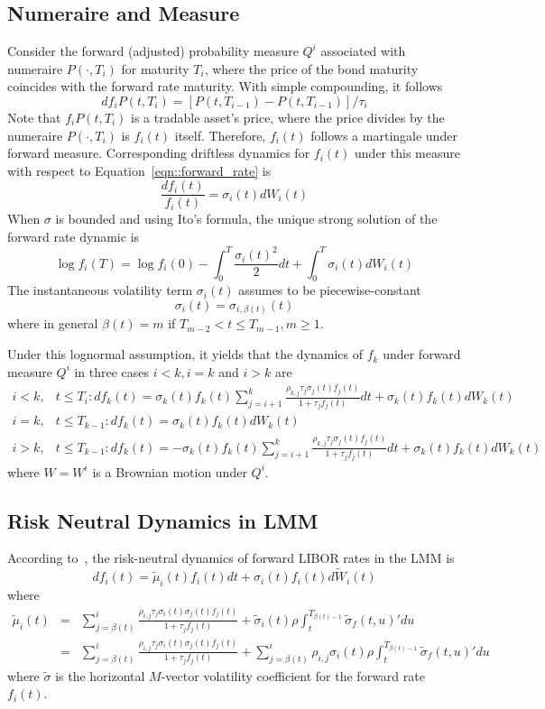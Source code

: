 \subsection{Numeraire and Measure}
Consider the forward (adjusted) probability measure $Q^i$ associated with numeraire $P(\cdot,T_i)$ for maturity $T_i$, where the price of the bond maturity coincides with the forward rate maturity. With simple compounding, it follows
$$
d f_i P(t,T_i) = [P(t,T_{i-1}) - P(t,T_{i-1})] / \tau_i
$$
Note that $f_i P(t,T_i)$ is a tradable asset's price, where the price divides by the numeraire $P(\cdot,T_i)$ is $f_i(t)$ itself. Therefore, $f_i(t)$ follows a martingale under forward measure. Corresponding driftless dynamics for $f_i(t)$ under this measure with respect to Equation~\ref{eqn::forward_rate} is
$$
\frac{d f_i(t)}{f_i(t)} = \sigma_i(t) dW_i(t)
$$
When $\sigma$ is bounded and using Ito's formula, the unique strong solution of the forward rate dynamic is
$$
\log f_i (T) = \log f_i(0) - \int_0^T \frac{\sigma_i(t)^2}{2} dt + \int_0^T \sigma_i(t) dW_i(t)
$$
The instantaneous volatility term $\sigma_i(t)$ assumes to be piecewise-constant
$$
\sigma_i(t) = \sigma_{i,\beta(t)}(t)
$$
where in general $\beta(t)=m$ if $T_{m-2}<t \leq T_{m-1}, m\geq 1$.

Under this lognormal assumption, it yields that the dynamics of $f_k$ under forward measure $Q^i$ in three cases $i<k, i=k$ and $i>k$ are
\begin{eqnarray*}
i<k,& t\leq T_i: df_k(t) = \sigma_k(t)f_k(t)\sum_{j=i+1}^{k}\frac{\rho_{k,j}\tau_j\sigma_j(t)f_j(t)}{1+\tau_j f_j(t)}dt + \sigma_k(t) f_k(t) dW_k(t) \\
i=k,& t\leq T_{k-1}: df_k(t) = \sigma_k(t) f_k(t) dW_k(t) \\
i>k,& t\leq T_{k-1}: df_k(t) = -\sigma_k(t)f_k(t)\sum_{j=i+1}^{k}\frac{\rho_{k,j}\tau_j\sigma_j(t)f_j(t)}{1+\tau_j f_j(t)}dt + \sigma_k(t) f_k(t) dW_k(t)
\end{eqnarray*}
where $W=W^i$ is a Brownian motion under $Q^i$.

\subsection{Risk Neutral Dynamics in LMM}
According to~\cite{bm06}, the risk-neutral dynamics of forward LIBOR rates in the LMM is
$$
d f_i(t) = \tilde{\mu}_i(t) f_i(t)dt + \sigma_i(t)f_i(t) d \tilde{W}_i(t)
$$
where
\begin{eqnarray*}
\tilde{\mu}_i(t) &=& \sum_{j=\beta(t)}^{i} \frac{\rho_{i,j}\tau_j\sigma_i(t)\sigma_j(t)f_j(t)}{1+\tau_j f_j(t)} + \tilde{\sigma}_i(t)\rho\int_t^{T_{\beta(t)-1}}\tilde{\sigma}_f(t,u)'du \\
                 &=& \sum_{j=\beta(t)}^{i} \frac{\rho_{i,j}\tau_j\sigma_i(t)\sigma_j(t)f_j(t)}{1+\tau_j f_j(t)} + \sum_{j=\beta(t)}^{i} \rho_{i,j}\sigma_i(t)\rho\int_t^{T_{\beta(t)-1}}\tilde{\sigma}_f(t,u)'du
\end{eqnarray*}
where $\tilde{\sigma}$ is the horizontal $M$-vector volatility coefficient for the forward rate $f_i(t)$.


